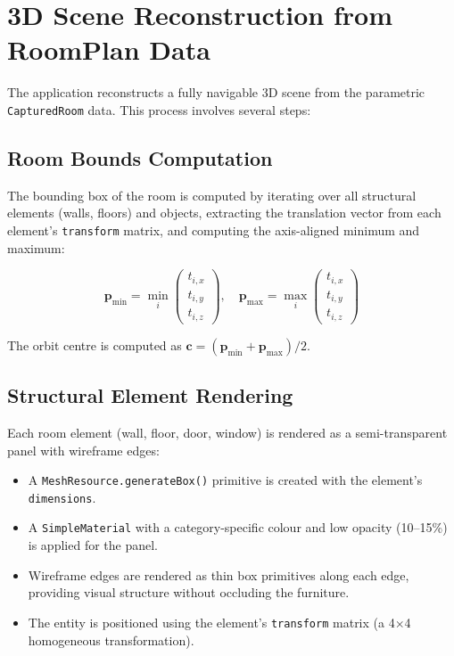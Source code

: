 \section{3D Scene Reconstruction from RoomPlan Data}
\label{sec:scene_reconstruction}

The application reconstructs a fully navigable 3D scene from the parametric \texttt{CapturedRoom} data. This process involves several steps:

\subsection{Room Bounds Computation}

The bounding box of the room is computed by iterating over all structural elements (walls, floors) and objects, extracting the translation vector from each element's \texttt{transform} matrix, and computing the axis-aligned minimum and maximum:

\[
    \mathbf{p}_{\min} = \min_i \begin{pmatrix} t_{i,x} \\ t_{i,y} \\ t_{i,z} \end{pmatrix}, \quad
    \mathbf{p}_{\max} = \max_i \begin{pmatrix} t_{i,x} \\ t_{i,y} \\ t_{i,z} \end{pmatrix}
\]

The orbit centre is computed as $\mathbf{c} = (\mathbf{p}_{\min} + \mathbf{p}_{\max}) / 2$.

\subsection{Structural Element Rendering}

Each room element (wall, floor, door, window) is rendered as a semi-transparent panel with wireframe edges:

\begin{itemize}
    \item A \texttt{MeshResource.generateBox()} primitive is created with the element's \texttt{dimensions}.
    \item A \texttt{SimpleMaterial} with a category-specific colour and low opacity (10--15\%) is applied for the panel.
    \item Wireframe edges are rendered as thin box primitives along each edge, providing visual structure without occluding the furniture.
    \item The entity is positioned using the element's \texttt{transform} matrix (a 4$\times$4 homogeneous transformation).
\end{itemize}


